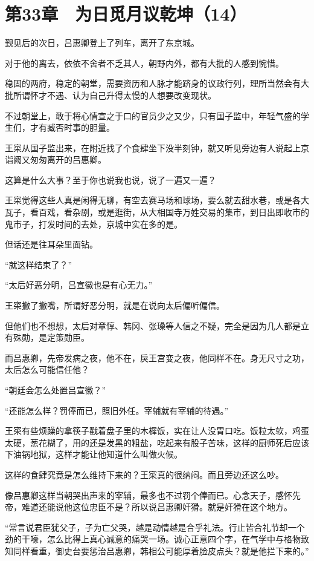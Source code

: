 \section{第33章　为日觅月议乾坤（14）}

觐见后的次日，吕惠卿登上了列车，离开了东京城。

对于他的离去，依依不舍者不乏其人，朝野内外，都有大批的人感到惋惜。

稳固的两府，稳定的朝堂，需要资历和人脉才能跻身的议政行列，理所当然会有大批所谓怀才不遇、认为自己升得太慢的人想要改变现状。

不过朝堂上，敢于将心情宣之于口的官员少之又少，只有国子监中，年轻气盛的学生们，才有臧否时事的胆量。

王寀从国子监出来，在附近找了个食肆坐下没半刻钟，就又听见旁边有人说起上京诣阙又匆匆离开的吕惠卿。

这算是什么大事？至于你也说我也说，说了一遍又一遍？

王寀觉得这些人真是闲得无聊，有空去赛马场和球场，要么就去甜水巷，或是各大瓦子，看百戏，看杂剧，或是逛街，从大相国寺万姓交易的集市，到日出即收市的鬼市子，打发时间的去处，京城中实在多的是。

但话还是往耳朵里面钻。

“就这样结束了？”

“太后好恶分明，吕宣徽也是有心无力。”

王寀撇了撇嘴，所谓好恶分明，就是在说向太后偏听偏信。

但他们也不想想，太后对章惇、韩冈、张璪等人信之不疑，完全是因为几人都是立有殊勋，是定策勋臣。

而吕惠卿，先帝发病之夜，他不在，戾王宫变之夜，他同样不在。身无尺寸之功，太后怎么可能信任他？

“朝廷会怎么处置吕宣徽？”

“还能怎么样？罚俸而已，照旧外任。宰辅就有宰辅的待遇。”

王寀有些烦躁的拿筷子戳着盘子里的木樨饭，实在让人没胃口吃。饭粒太软，鸡蛋太硬，葱花糊了，用的还是发黑的粗盐，吃起来有股子苦味，这样的厨师死后应该下油锅地狱，这样才能让他知道什么叫做火候。

这样的食肆究竟是怎么维持下来的？王寀真的很纳闷。而且旁边还这么吵。

像吕惠卿这样当朝哭出声来的宰辅，最多也不过罚个俸而已。心念天子，感怀先帝，难道还能说他这位忠臣不是？所以说吕惠卿奸猾。就是奸猾在这个地方。

“常言说君臣犹父子，子为亡父哭，越是动情越是合乎礼法。行止皆合礼节却一个劲的干嚎，怎么比得上真心诚意的痛哭一场。诚心正意四个字，在气学中与格物致知同样看重，御史台要惩治吕惠卿，韩相公可能厚着脸皮点头？就是他拦下来的。”


